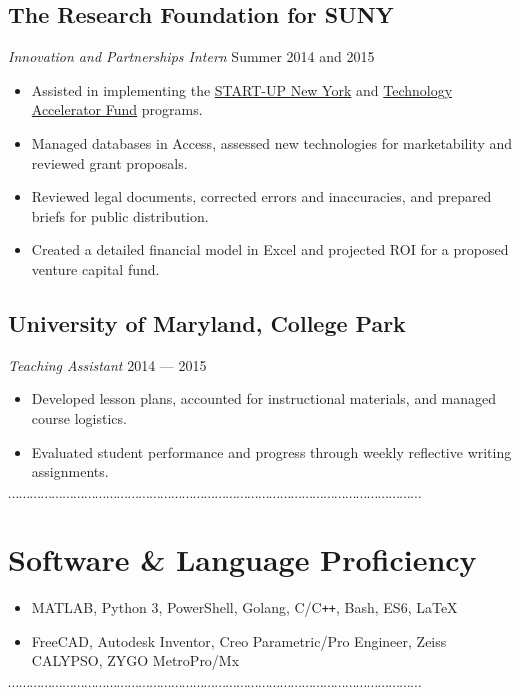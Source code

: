 \documentclass[10pt]{article}
\newcommand{\dotfringe}{
    \begin{center}
      $\cdots\cdots\cdots\cdots\cdots\cdots\cdots\cdots\cdots\cdots\cdots\cdots\cdots\cdots\cdots\cdots\cdots\cdots\cdots\cdots\cdots\cdots\cdots\cdots\cdots\cdots\cdots\cdots\cdots\cdots\cdots\cdots\cdots\cdots\cdots\cdots\cdots\cdots$
    \end{center}
}
\begin{document}
\subsection*{The Research Foundation for SUNY}
\textit{Innovation and Partnerships Intern} \hfill Summer 2014 and 2015
\begin{itemize}
  \item Assisted in implementing the \href{https://startup.ny.gov/}{START-UP New York} and \href{https://www.rfsuny.org/Our-Work/Innovation-and-Partnerships/Programs/Technology-Accelerator-Fund/}{Technology Accelerator Fund} programs.
  \item Managed databases in Access, assessed new technologies for marketability and reviewed grant proposals.
  \item Reviewed legal documents, corrected errors and inaccuracies, and prepared briefs for public distribution.
  \item Created a detailed financial model in Excel and projected ROI for a proposed venture capital fund.
\end{itemize}
\subsection*{University of Maryland, College Park}
\textit{Teaching Assistant} \hfill 2014 --- 2015
\begin{itemize}
  \item Developed lesson plans, accounted for instructional materials, and managed course logistics.
  \item Evaluated student performance and progress through weekly reflective writing assignments.
\end{itemize}
\dotfringe{}
\section*{Software \& Language Proficiency}
\begin{itemize}
  \item MATLAB, Python 3, PowerShell, Golang, C/C\texttt{++}, Bash, ES6, \LaTeX{}
  \item FreeCAD, Autodesk Inventor, Creo Parametric/Pro Engineer, Zeiss CALYPSO, ZYGO MetroPro/Mx
\end{itemize}

\dotfringe{}
\end{document}
